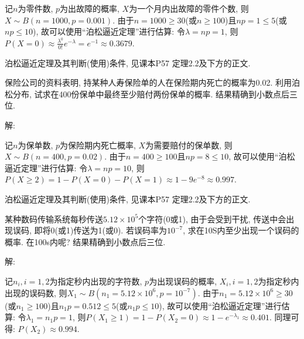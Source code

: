 \documentclass[standard]{ExBook}
\begin{document}
\begin{qitems}
\begin{bbox}
记$n$为零件数, $p$为出故障的概率, $X$为一个月内出故障的零件个数, 则$X\sim B(n=1000,p=0.001)$. 由于$n=1000\geq30$(或$n\geq100$)且$np=1 \leq 5$(或$np \leq 10$), 故可以使用``泊松逼近定理''进行估算: 令$\lambda=np=1$, 则$P(X=0)\approx\frac{\lambda^{0}}{0!}e^{-\lambda}=e^{-1}\approx0.3679$.

\textcolor{themeColor}{\selectfont {} 泊松逼近定理及其判断(使用)条件, 见课本P57 定理2.2及下方的正文.}
    \end{bbox}

\vspace{-5em}

    \begin{bbox}
    \begin{shaded}
        \qitem
保险公司的资料表明, 持某种人寿保险单的人在保险期内死亡的概率为0.02. 利用泊松分布, 试求在400份保单中最终至少赔付两份保单的概率. 结果精确到小数点后三位.
    \end{shaded}
    \end{bbox}

\vspace{-5em}

    \begin{bbox}
解: 

记$n$为保单数, $p$为保险期内死亡概率, $X$为需要赔付的保单数, 则$X\sim B(n=400,p=0.02)$. 由于$n=400\geq100$且$np=8 \leq 10$, 故可以使用``泊松逼近定理''进行估算: 令$\lambda=np=10$, 则$P(X \geq 2)=1-P(X=0)-P(X=1)\approx1-9e^{-8}\approx0.997$.

\textcolor{themeColor}{\selectfont {} 泊松逼近定理及其判断(使用)条件, 见课本P57 定理2.2及下方的正文.}
    \end{bbox}

\vspace{-5em}

    \begin{bbox}
    \begin{shaded}
        \qitem
某种数码传输系统每秒传送$5.12\times10^5$个字符(0或1), 由于会受到干扰, 传送中会出现误码, 即将0(或1)传送为1(或0). 若误码率为$10^{-7}$, 求在10S内至少出现一个误码的概率. 在100s内呢? 结果精确到小数点后三位.
    \end{shaded}
    \end{bbox}

\vspace{-5em}

    \begin{bbox}
解: 

记$n_{i},i=1,2$为指定秒内出现的字符数, $p$为出现误码的概率, $X_{i},i=1,2$为指定秒内出现的误码数, 则$X_{1}\sim B(n_{1}=5.12\times10^{6},p=10^{-7})$. 由于$n_{1}=5.12\times10^{6}\geq30$(或$n_{1}\geq100$)且$n_{1}p=0.512 \leq 5$(或$n_{1}p \leq 10$), 故可以使用``泊松逼近定理''进行估算: 令$\lambda_{1}=n_{1}p=1$, 则$P(X_{1} \geq 1)=1-P(X_{2}=0)\approx1-e^{-\lambda_{1}}\approx0.401$. 同理可得: $P(X_{2})\approx0.994$.


\end{bbox}
\end{qitems}
\end{document}
